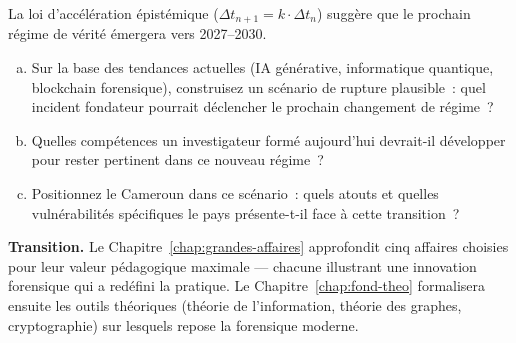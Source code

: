 \begin{boxexo}[title={\ding{45}\quad Exercice~2.3 --- Prospective \niveauexpert}]
La loi d'accélération épistémique ($\Delta t_{n+1} = k \cdot \Delta t_n$)
suggère que le prochain régime de vérité émergera vers 2027--2030.

\begin{enumerate}[(a)]
    \item Sur la base des tendances actuelles (IA générative, informatique
          quantique, blockchain forensique), construisez un scénario de rupture
          plausible~: quel incident fondateur pourrait déclencher le prochain
          changement de régime~?
    \item Quelles compétences un investigateur formé aujourd'hui devrait-il
          développer pour rester pertinent dans ce nouveau régime~?
    \item Positionnez le Cameroun dans ce scénario~: quels atouts et quelles
          vulnérabilités spécifiques le pays présente-t-il face à cette
          transition~?
\end{enumerate}
\end{boxexo}

\bigskip

\begin{boxinfo}
\textbf{Transition.} Le Chapitre~\ref{chap:grandes-affaires} approfondit
cinq affaires choisies pour leur valeur pédagogique maximale --- chacune
illustrant une innovation forensique qui a redéfini la pratique. Le
Chapitre~\ref{chap:fond-theo} formalisera ensuite les outils théoriques
(théorie de l'information, théorie des graphes, cryptographie) sur lesquels
repose la forensique moderne.
\end{boxinfo}
